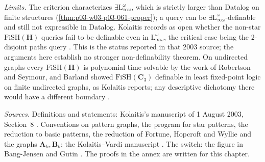 \emph{Limits.} The criterion characterizes
\(\exists\mathrm L^\omega_{\infty\omega}\), which is strictly larger than
Datalog on finite structures (\cref{thm:p03-w03-p03-061-proper}); a query can be
\(\exists\mathrm L^\omega_{\infty\omega}\)-definable and still not
expressible in Datalog. Kolaitis records as open whether the non-star
\(\mathrm{FiSH}(\mathbf H)\) queries fail to be definable even in
\(\mathrm L^\omega_{\infty\omega}\), the critical case being the 2-disjoint
paths query \cite[p.~79]{Kolaitis2003ExpressivePowerNotes}. This is the
status reported in that 2003 source; the arguments here establish no
stronger non-definability theorem. On undirected graphs every
\(\mathrm{FiSH}(\mathbf H)\) is polynomial-time solvable by the work of
Robertson and Seymour, and Barland showed \(\mathrm{FiSH}(\mathbf C_3)\)
definable in least fixed-point logic on finite undirected graphs, as Kolaitis
reports; any descriptive dichotomy there would have a different boundary
\cite[p.~79]{Kolaitis2003ExpressivePowerNotes}.

\emph{Sources.} Definitions and statements: Kolaitis's manuscript of
1 August 2003, Section~8 \cite[pp.~69--79]{Kolaitis2003ExpressivePowerNotes}.
Conventions on pattern graphs, the program for star patterns, the
reduction to basic patterns, the reduction of Fortune, Hopcroft and Wyllie
and the graphs \(\mathbf A_k,\mathbf B_k\): the Kolaitis--Vardi manuscript
\cite[pp.~22--39]{KolaitisVardi1995DatalogManuscript}. The switch: the figure
in Bang-Jensen and Gutin \cite[Fig.~9.1, p.~479]{BangJensenGutin2007DigraphsCorrected}.
The proofs in the annex are written for this chapter.
